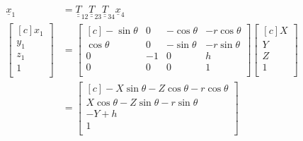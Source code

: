 \documentclass[onecolumn,10pt]{jhwhw}
\def\du#1{\underline{\underline{#1}}}
\begin{document}
\begin{align*}
\underline{x}_1 &= \du{T}_{12} \du{T}_{23} \du{T}_{34} \underline{x}_4 \\
\begin{bmatrix*}[c]
x_1 \\
y_1 \\
z_1 \\
1 \\
\end{bmatrix*}
& =
\begin{bmatrix*}[c]
-\sin \theta &  0 & -\cos \theta & -r \cos \theta \\
 \cos \theta &  0 & -\sin \theta & -r \sin \theta \\
          0 & -1 &           0 &             h \\
          0 &  0 &           0 &             1 \\
\end{bmatrix*}
\begin{bmatrix*}[c]
X \\
Y \\
Z \\
1 \\
\end{bmatrix*}\\
&=
\begin{bmatrix*}[c]
-X \sin \theta - Z \cos \theta - r \cos \theta \\
 X \cos \theta - Z \sin \theta - r \sin \theta \\
                                      -Y + h \\
                                            1 \\
\end{bmatrix*}\\

\end{align*}
\end{document}
